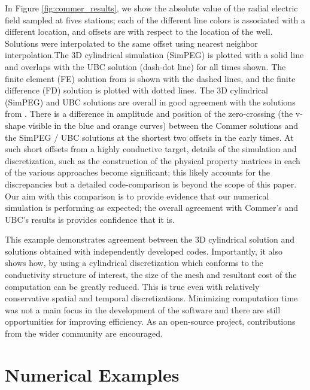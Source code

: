 \documentclass[preprint,review,3p,times,onecolumn,authoryear]{elsarticle}
\begin{document}



In Figure \ref{fig:commer_results}, we show the absolute value of the radial electric field sampled at fives stations; each of the different line colors is associated with a different location, and offsets are with respect to the location of the well. Solutions were interpolated to the same offset using nearest neighbor interpolation.The 3D cylindrical simulation (SimPEG) is plotted with a solid line and overlaps with the UBC solution (dash-dot line) for all times shown. The finite element (FE) solution from \cite{Commer2015} is shown with the dashed lines, and the finite difference (FD) solution is plotted with dotted lines. The 3D cylindrical (SimPEG) and UBC solutions are overall in good agreement with the solutions from \cite{Commer2015}. There is a difference in amplitude and position of the zero-crossing (the v-shape visible in the blue and orange curves) between the Commer solutions and the SimPEG / UBC solutions at the shortest two offsets in the early times. At such short offsets from a highly conductive target, details of the simulation and discretization, such as the construction of the physical property matrices in each of the various approaches become significant; this likely accounts for the discrepancies but a detailed code-comparison is beyond the scope of this paper. Our aim with this comparison is to provide evidence that our numerical simulation is performing as expected; the overall agreement with Commer’s and UBC’s results is provides confidence that it is.




This example demonstrates agreement between the 3D cylindrical solution and solutions obtained with independently developed codes. Importantly, it also shows how, by using a cylindrical discretization which conforms to the conductivity structure of interest, the size of the mesh and resultant cost of the computation can be greatly reduced. This is true even with relatively conservative spatial and temporal discretizations. Minimizing computation time was not a main focus in the development of the software and there are still opportunities for improving efficiency. As an open-source project, contributions from the wider community are encouraged.


\section{Numerical Examples}
\label{sec:numerical_examples}
\end{document}
